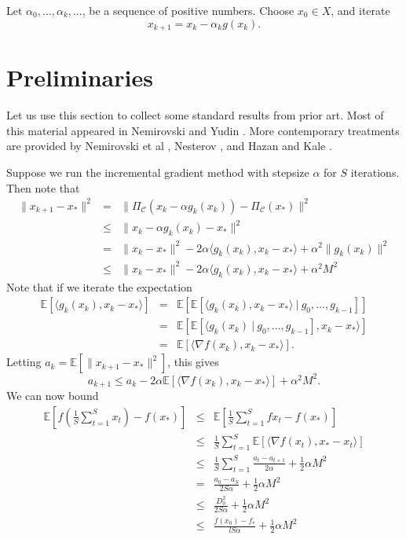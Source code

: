 Let $\alpha_0,\ldots,\alpha_k,\ldots$, be a sequence of positive numbers. Choose $x_0 \in X$, and iterate
\begin{equation}
x_{k+1}=x_k-\alpha_k g(x_k).
\end{equation}

\section{Preliminaries}
Let us use this section to collect some standard results from prior art. Most of this material appeared in Nemirovski and Yudin \cite{Nemirovski1978, Nemirovski1983}. More contemporary treatments are provided by Nemirovski et al \cite{Nemirovski2009}, Nesterov \cite{Nesterov2009}, and Hazan and Kale \cite{Hazan2011}.

Suppose we run the incremental gradient method with stepsize $\alpha$ for $S$ iterations. Then note that
\begin{eqnarray}
\|x_{k+1}-x_*\|^2 &=& \| \Pi_{\mathcal{C}} (x_k-\alpha g_k (x_k)) - \Pi_{\mathcal{C}} (x_*) \|^2 \\
&\leq& \|x_k -\alpha g_k(x_k)-x_*\|^2 \\
&=& \|x_k -x_*\|^2 -2\alpha \langle g_k(x_k), x_k-x_* \rangle +\alpha^2 \|g_k (x_k)\|^2 \\
&\leq& \|x_k-x_*\|^2 -2\alpha \langle g_k(x_k), x_k-x_* \rangle +\alpha^2 M^2
\end{eqnarray}
Note that if we iterate the expectation
\begin{eqnarray}
\mathbb{E}[\langle g_k(x_k), x_k-x_* \rangle] &=& \mathbb{E}[\mathbb{E}[\langle g_k(x_k), x_k-x_* \rangle\ |\ g_0,\ldots,g_{k-1}]] \\
&=&\mathbb{E}[\mathbb{E}[\langle g_k(x_k) \ |\ g_0,\ldots,g_{k-1}], x_k-x_* \rangle] \\
&=& \mathbb{E}[\langle \nabla f(x_k), x_k-x_* \rangle].
\end{eqnarray}
Letting $a_k = \mathbb{E}[\| x_{k+1} - x_*\|^2]$, this gives
\begin{equation}\label{eq:eqproof30}
a_{k+1}\leq a_k -2 \alpha \mathbb{E}[\langle \nabla f(x_k), x_k-x_* \rangle ]+\alpha^2 M^2.
\end{equation}
We can now bound
\begin{eqnarray}
\mathbb{E}\left[ f \left( \frac{1}{S} \sum_{t=1}^S x_t \right) -f(x_*)\right] &\leq& \mathbb{E}\left[ \frac{1}{S} \sum_{t=1}^S f{x_t}  -f(x_*)\right] \label{eq:eqproof31}\\
&\leq& \frac{1}{S} \sum_{t=1}^S \mathbb{E}[\langle \nabla f(x_t), x_*-x_t \rangle] \label{eq:eqproof32}\\
&\leq& \frac{1}{S}\sum_{t=1}^S \frac{a_t-a_{t+1}}{2\alpha} +\frac{1}{2} \alpha M^2 \label{eq:eqproof33} \\
&=& \frac{a_0-a_S}{2S\alpha} +\frac{1}{2} \alpha M^2 \label{eq:eqproof34}\\
&\leq& \frac{D_0^2}{2S\alpha} +\frac{1}{2} \alpha M^2 \label{eq:eqproof35}\\
&\leq& \frac{f(x_0)-f_*}{lS\alpha}+\frac{1}{2} \alpha M^2 \label{eq:eqproof36}
\end{eqnarray}
